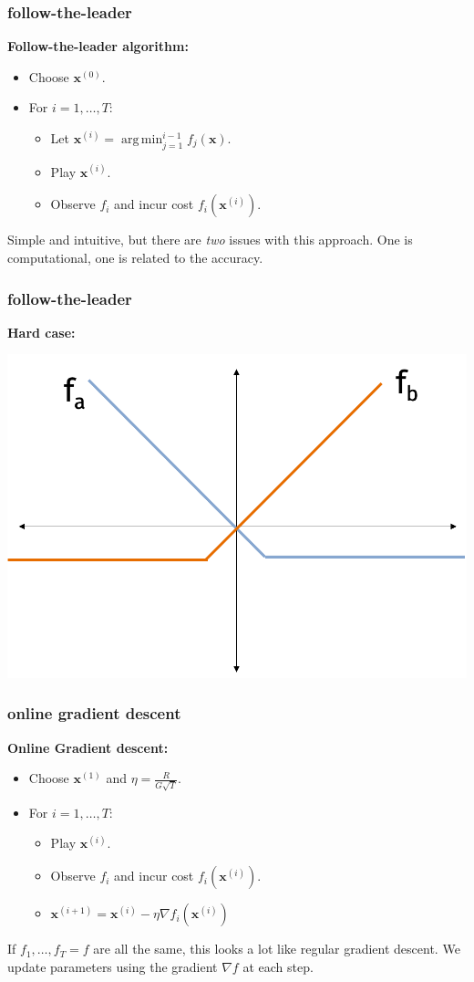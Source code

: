 \documentclass[compress]{beamer}
\newcommand{\bv}[1]{\mathbf{#1}}
\DeclareMathOperator*{\argmin}{arg\,min}
\begin{document}
\begin{frame}[t]
	\frametitle{follow-the-leader}
		\textbf{Follow-the-leader algorithm:}
	\begin{itemize}
		\item Choose $\bv{x}^{(0)}$.
		\item For $i = 1,\ldots, T$:
		\begin{itemize}
			\item Let $\bv{x}^{(i)} = \argmin_{j=1}^{i-1} f_j(\bv{x})$.
			\item Play $\bv{x}^{(i)}$.
			\item Observe $f_{i}$ and incur cost $f_{i}(\bv{x}^{(i)})$. 
		\end{itemize}
	\end{itemize}
Simple and intuitive, but there are \emph{two} issues with this approach. One is computational, one is related to the accuracy.
	
\end{frame}

\begin{frame}[t]
	\frametitle{follow-the-leader}
	\textbf{Hard case:}
\begin{center}
	\includegraphics[width=.7\textwidth]{hard_case_ftl.png}
	\end{center}
\end{frame}


\begin{frame}[t]
	\frametitle{online gradient descent}
	\textbf{Online Gradient descent:}
\begin{itemize}
	\item Choose $\bv{x}^{(1)}$ and $\eta = \frac{R}{G\sqrt{T}}$. 
	\item For $i = 1,\ldots, T$:
	\begin{itemize}
		\item Play $\bv{x}^{(i)}$.
		\item Observe $f_{i}$ and incur cost $f_{i}(\bv{x}^{(i)})$. 
		\item $\bv{x}^{(i+1)} = \bv{x}^{(i)} - \eta \nabla f_i(\bv{x}^{(i)})$
	\end{itemize}
\end{itemize}
If $f_1, \ldots, f_T = f$ are all the same, this looks a lot like regular gradient descent. We update parameters using the gradient $\nabla f$ at each step. 
\end{frame}
\end{document}
